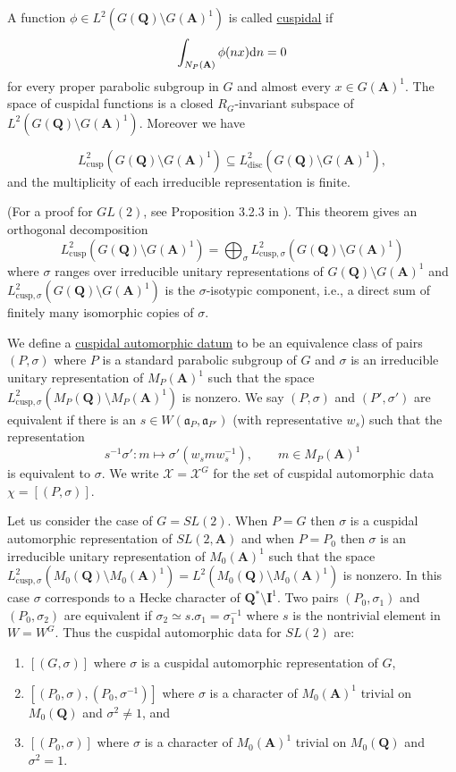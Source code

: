 \documentclass{ims9x6}
\def\A{\mathbf A}
\def\I{\mathbf I}
\def\Q{\mathbf Q}
\def\XXX{\mathcal X}
\def\aaa{\mathfrak a}
\def\d{\text d}
\def\bs{\setminus}
\def\cusp{\text{cusp}}
\def\disc{\text{disc}}
\def\Ltwo{L^2}
\begin{document}
A function $\phi \in \Ltwo(G(\Q) \bs G(\A)^1)$ is called \underline{cuspidal} if 
\[ \int_{N_P(\A)} \phi(nx) \d n = 0 \]
for every proper parabolic subgroup in $G$ and almost every $x \in G(\A)^1$. The space of cuspidal functions is a closed $R_G$-invariant subspace of $\Ltwo(G(\Q)\bs G(\A)^1)$. Moreover we have
\begin{theorem} \cite{MR1071179}
	\[ \Ltwo_\cusp(G(\Q)\bs G(\A)^1) \subseteq \Ltwo_\disc(G(\Q)\bs G(\A)^1), \]
	and the multiplicity of each irreducible representation is finite. 
\end{theorem}
(For a proof for $GL(2)$, see Proposition 3.2.3 in \cite{MR1431508}). This theorem gives an orthogonal decomposition
\[ \Ltwo_\cusp(G(\Q)\bs G(\A)^1) = \bigoplus_\sigma \Ltwo_{\cusp, \sigma} (G(\Q)\bs G(\A)^1) \]
where $\sigma$ ranges over irreducible unitary representations of $G(\Q)\bs G(\A)^1$ and $\Ltwo_{\cusp, \sigma} (G(\Q)\bs G(\A)^1)$ is the $\sigma$-isotypic component, i.e., a direct sum of finitely many isomorphic copies of $\sigma$. 

We define a \underline{cuspidal automorphic datum} to be an equivalence class of pairs $(P, \sigma)$ where $P$ is a standard parabolic subgroup of $G$ and $\sigma$ is an irreducible unitary representation of $M_P(\A)^1$ such that the space $\Ltwo_{\cusp, \sigma} (M_P(\Q)\bs M_P(\A)^1)$ is nonzero. We say $(P, \sigma)$ and $(P', \sigma')$ are equivalent if there is an $s \in W(\aaa_P, \aaa_{P'})$ (with representative $w_s$) such that the representation 
\[ s^{-1}\sigma' : m \mapsto \sigma'(w_s m w_s^{-1}), \qquad m \in M_P(\A)^1 \]
is equivalent to $\sigma$. We write $\XXX = \XXX^G$ for the set of cuspidal automorphic data $\chi = [(P, \sigma)]$. 

Let us consider the case of $G = SL(2)$. When $P=G$ then $\sigma$ is a cuspidal automorphic representation of $SL(2,\A)$ and when $P=P_0$ then $\sigma$ is an irreducible unitary representation of $M_0(\A)^1$ such that the space $\Ltwo_{\text{cusp}, \sigma}(M_0(\Q)\bs M_0(\A)^1) = \Ltwo(M_0(\Q)\bs M_0(\A)^1)$ is nonzero. In this case $\sigma$ corresponds to a Hecke character of $\Q^*\bs \I^1$. Two pairs $(P_0, \sigma_1)$ and $(P_0, \sigma_2)$ are equivalent if $\sigma_2 \simeq s.\sigma_1 = \sigma_1^{-1}$ where $s$ is the nontrivial element in $W = W^G$. Thus the cuspidal automorphic data for $SL(2)$ are:
\begin{enumerate}
\item $[(G, \sigma)]$ where $\sigma$ is a cuspidal automorphic representation of $G$,
\item $[(P_0, \sigma), (P_0, \sigma^{-1})]$ where $\sigma$ is a character of $M_0(\A)^1$ trivial on $M_0(\Q)$ and $\sigma^2 \neq 1$, and
\item $[(P_0, \sigma)]$ where $\sigma$ is a character of $M_0(\A)^1$ trivial on $M_0(\Q)$ and $\sigma^2 = 1$.
\end{enumerate}
\end{document}
